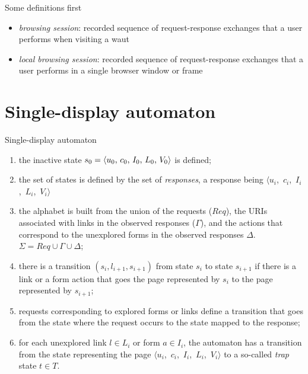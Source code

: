 \documentclass[usenames,dvipsnames]{beamer}
\newcommand{\res}[1][]{
  \ifthenelse{\equal{#1}{}}{\mbox{$\langle u$, $c$, $I$, $L$, $V\rangle$}}
  {\mbox{$\langle u_{#1}$, $c_{#1}$, $I_{#1}$, $L_{#1}$, $V_{#1}\rangle$}}
}
\theoremstyle{definition}
\newtheorem{procedure}{Procedure}
\begin{document}
\begin{frame}{Some definitions first}
  \begin{itemize}
    \item \textit{browsing session}: recorded sequence of request-response exchanges that a user performs when visiting a \gls{waut}
    \item \textit{local browsing session}: recorded sequence of request-response exchanges that a user performs in a single browser window or frame
  \end{itemize}
\end{frame}



\section{Single-display automaton}
\begin{frame}[t,allowframebreaks]{Single-display automaton}

    \begin{enumerate}
      \item the inactive state $s_0 = \res[0]$ is defined;
      \item the set of states is defined by the set of \emph{responses}, a response being \res[i]
      \item the alphabet is built from the union of the requests ($Req$), the URIs associated with links in the observed responses ($\Gamma$), and the actions that correspond to the unexplored forms in the observed responses $\Delta$. $\Sigma=Req\cup\Gamma\cup\Delta$;
      \item there is a transition $(s_i,l_{i+1},s_{i+1})$ from state $s_i$ to state $s_{i+1}$ if there is a link or a form action that goes the page represented by $s_i$ to the page represented by $s_{i+1}$;
      \item requests corresponding to explored forms or links define a transition that goes from the state where the request occurs to the state mapped to the response;
      \item for each unexplored link $l \in L_i$ or form $a \in I_i$, the automaton has a transition from the state representing the page \res[i] to a so-called \textit{trap} state $t \in T$.
    \end{enumerate}
\end{frame}
\end{document}
